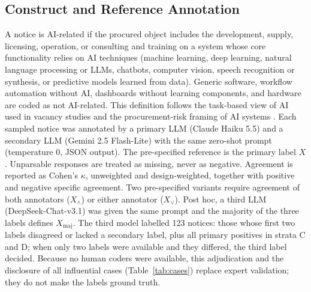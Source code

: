 \documentclass[runningheads]{llncs}
\begin{document}
\subsection{Construct and Reference Annotation}
A notice is AI-related if the procured object includes the development, supply, licensing, operation, or consulting and training on a system whose core functionality relies on AI techniques (machine learning, deep learning, natural language processing or LLMs, chatbots, computer vision, speech recognition or synthesis, or predictive models learned from data). Generic software, workflow automation without AI, dashboards without learning components, and hardware are coded as not AI-related. This definition follows the task-based view of AI used in vacancy studies \cite{acemoglu2022} and the procurement-risk framing of AI systems \cite{hickok2022}. Each sampled notice was annotated by a primary LLM (Claude Haiku 5.5) and a secondary LLM (Gemini 2.5 Flash-Lite) with the same zero-shot prompt (temperature 0, JSON output). The pre-specified reference is the primary label $X$. Unparsable responses are treated as missing, never as negative. Agreement is reported as Cohen's $\kappa$, unweighted and design-weighted, together with positive and negative specific agreement. Two pre-specified variants require agreement of both annotators ($X_\wedge$) or either annotator ($X_\vee$). Post hoc, a third LLM (DeepSeek-Chat-v3.1) was given the same prompt and the majority of the three labels defines $X_{\mathrm{maj}}$. The third model labelled 123 notices: those whose first two labels disagreed or lacked a secondary label, plus all primary positives in strata C and D; when only two labels were available and they differed, the third label decided.
Because no human coders were available, this adjudication and the disclosure of all influential cases (Table~\ref{tab:cases}) replace expert validation; they do not make the labels ground truth.
\end{document}
